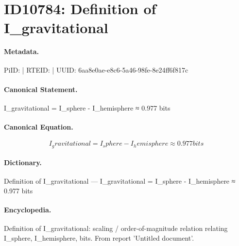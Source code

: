 \section*{ID10784: Definition of I\_gravitational}
\paragraph{Metadata.}
PiID:  | RTEID:  | UUID: 6aa8e0ae-e8c6-5a46-98fe-8e24ff6f817c

\paragraph{Canonical Statement.}
I\_gravitational = I\_sphere - I\_hemisphere ≈ 0.977 bits

\paragraph{Canonical Equation.}
\[
I_gravitational = I_sphere - I_hemisphere ≈ 0.977 bits
\]

\paragraph{Dictionary.}
Definition of I\_gravitational — I\_gravitational = I\_sphere - I\_hemisphere ≈ 0.977 bits

\paragraph{Encyclopedia.}
Definition of I\_gravitational: scaling / order-of-magnitude relation relating I\_sphere, I\_hemisphere, bits. From report 'Untitled document'.

